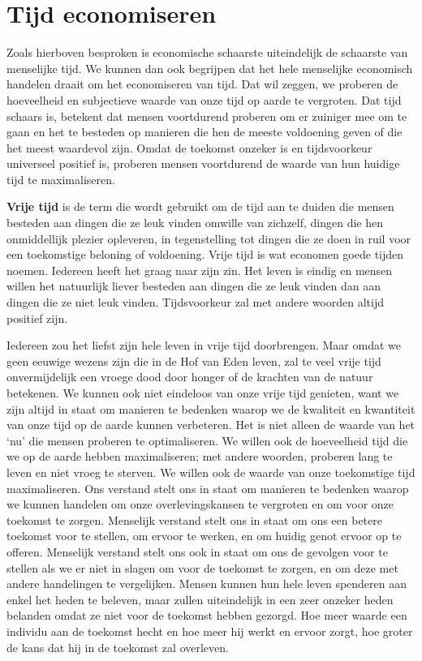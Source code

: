 \section{Tijd economiseren}

Zoals hierboven besproken is economische schaarste uiteindelijk de
schaarste van menselijke tijd. We kunnen dan ook begrijpen dat het hele
menselijke economisch handelen draait om het economiseren van tijd. Dat wil
zeggen, we proberen de hoeveelheid en subjectieve waarde van onze tijd
op aarde te vergroten. Dat tijd schaars is, betekent dat mensen
voortdurend proberen om er zuiniger mee om te gaan en het te besteden op
manieren die hen de meeste voldoening geven of die het meest waardevol
zijn. Omdat de toekomst onzeker is en tijdsvoorkeur universeel positief
is, proberen mensen voortdurend de waarde van hun huidige tijd te
maximaliseren. 

\textbf{Vrije tijd} is de term die wordt gebruikt om de
tijd aan te duiden die mensen besteden aan dingen die ze leuk vinden
omwille van zichzelf, dingen die hen onmiddellijk plezier opleveren, in
tegenstelling tot dingen die ze doen in ruil voor een toekomstige
beloning of voldoening. Vrije tijd is wat economen goede tijden noemen.
Iedereen heeft het graag naar zijn zin. Het leven is eindig en mensen
willen het natuurlijk liever besteden aan dingen die ze leuk vinden dan
aan dingen die ze niet leuk vinden. Tijdsvoorkeur zal met andere woorden
altijd positief zijn.

Iedereen zou het liefst zijn hele leven in vrije tijd doorbrengen. Maar
omdat we geen eeuwige wezens zijn die in de Hof van Eden leven, zal te
veel vrije tijd onvermijdelijk een vroege dood door honger of de
krachten van de natuur betekenen. We kunnen ook niet eindeloos van onze
vrije tijd genieten, want we zijn altijd in staat om manieren te
bedenken waarop we de kwaliteit en kwantiteit van onze tijd op de aarde
kunnen verbeteren. Het is niet alleen de waarde van het `nu' die mensen
proberen te optimaliseren. We willen ook de hoeveelheid tijd die we op
de aarde hebben maximaliseren; met andere woorden, proberen lang te
leven en niet vroeg te sterven. We willen ook de waarde van onze
toekomstige tijd maximaliseren. Ons verstand stelt ons in
staat om manieren te bedenken waarop we kunnen handelen om onze
overlevingskansen te vergroten en om voor onze toekomst te zorgen.
Menselijk verstand stelt ons in staat om ons een betere toekomst voor te
stellen, om ervoor te werken, en om huidig genot ervoor op te offeren.
Menselijk verstand stelt ons ook in staat om ons de gevolgen voor te
stellen als we er niet in slagen om voor de toekomst te zorgen, en om
deze met andere handelingen te vergelijken. Mensen kunnen hun hele leven spenderen aan enkel het heden te beleven, maar zullen uiteindelijk in een zeer onzeker heden belanden omdat ze niet voor de toekomst hebben gezorgd. Hoe meer waarde een individu
aan de toekomst hecht en hoe meer hij werkt en ervoor zorgt, hoe groter
de kans dat hij in de toekomst zal overleven.

